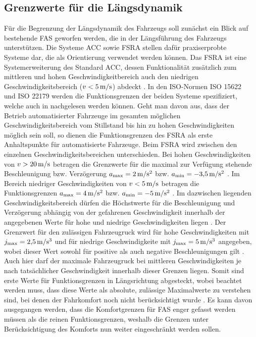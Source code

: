 \subsection{Grenzwerte für die Längsdynamik} \label{subsec:längsdynamik}
Für die Begrenzung der Längsdynamik des Fahrzeugs soll zunächst ein Blick auf bestehende \gls{FAS} geworfen werden, die  in der Längsführung des Fahrzeugs unterstützen. Die Systeme \gls{ACC} sowie \gls{FSRA} stellen dafür praxiserprobte Systeme dar, die als Orientierung verwendet werden können. Das \gls{FSRA} ist eine Systemerweiterung des Standard \gls{ACC}, dessen Funktionalität zusätzlich zum mittleren und hohen Geschwindigkeitbereich auch den niedrigen Geschwindigkeitsbereich ($v < 5\,\mathrm{m/s}$) abdeckt \cite{Winner.2012}. In den ISO-Normen ISO 15622 \cite{ISO.15622} und ISO 22179 \cite{ISO.22179} werden die Funktionsgrenzen der beiden Systeme spezifiziert, welche auch in \cite{Winner.2012} nachgelesen werden können. Geht man davon aus, dass der Betrieb automatisierter Fahrzeuge im gesamten möglichen Geschwindigkeitsbereich vom Stillstand bis hin zu hohen Geschwindigkeiten möglich sein soll, so dienen die Funktionsgrenzen des \gls{FSRA} als erste Anhaltspunkte für automatisierte Fahrzeuge. Beim \gls{FSRA} wird zwischen den einzelnen Geschwindigkeitsbereichen unterschieden. Bei hohen Geschwindigkeiten von $v>20\,\mathrm{m/s}$ betragen die Grenzwerte für die maximal zur Verfügung stehende Beschleunigung bzw. Verzögerung $a_{\textrm{max}} = 2\,\mathrm{m/s^2}$ bzw. $a_{\textrm{min}} = -3{,}5\,\mathrm{m/s^2}$ \cite{Winner.2012}. Im Bereich niedriger Geschwindigkeiten von $v < 5\,\mathrm{m/s}$ betragen die Funktionsgrenzen $a_{\textrm{max}} = 4\,\mathrm{m/s^2}$ bzw. $a_{\textrm{min}} = -5\,\mathrm{m/s^2}$ \cite{Winner.2012}. Im dazwischen liegenden Geschwindigkeitsbereich dürfen die Höchstwerte für die Beschleunigung und Verzögerung abhängig von der gefahrenen Geschwindigkeit innerhalb der angegebenen Werte für hohe und niedrige Geschwindigkeiten liegen \cite{Winner.2012}. Der Grenzwert für den zulässigen Fahrzeugruck wird für hohe Geschwindigkeiten mit $j_{\textrm{max}} = 2{,}5\,\mathrm{m/s^3}$ und für niedrige Geschwindigkeite mit $j_{\textrm{max}} = 5\,\mathrm{m/s^3}$ angegeben, wobei dieser Wert sowohl für positive als auch negative Beschleunigungen gilt \cite{Winner.2012}. Auch hier darf der maximale Fahrzeugruck bei mittleren Geschwindigkeiten je nach tatsächlicher Geschwindigkeit innerhalb dieser Grenzen liegen. Somit sind erste Werte für Funktionsgrenzen in Längsrichtung abgesteckt, wobei beachtet werden muss, dass diese Werte als absolute, zulässige Maximalwerte zu verstehen sind, bei denen der Fahrkomfort noch nicht berücksichtigt wurde \cite{Festner.2019}. Es kann davon ausgegangen werden, dass die Komfortgrenzen für \gls{FAS} enger gefasst werden müssen als die reinen Funktionsgrenzen, weshalb die Grenzen unter Berücksichtigung des Komforts nun weiter eingeschränkt werden sollen.

